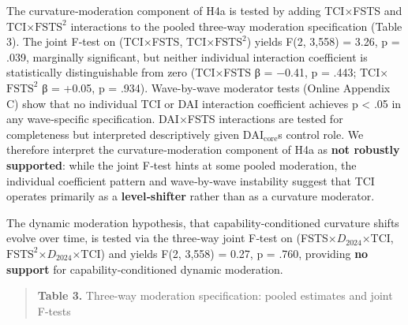 \documentclass[12pt,a4paper]{article}
\begin{document}
The curvature‑moderation component of H4a is tested by adding TCI×FSTS
and TCI×\(\mathrm{FSTS}^2\) interactions to the pooled three‑way
moderation specification (Table 3). The joint F‑test on (TCI×FSTS,
TCI×\(\mathrm{FSTS}^2\)) yields F(2, 3,558) = 3.26, p = .039, marginally
significant, but neither individual interaction coefficient is
statistically distinguishable from zero (TCI×FSTS β = −0.41, p = .443;
TCI×\(\mathrm{FSTS}^2\) β = +0.05, p = .934). Wave-by-wave moderator
tests (Online Appendix C) show that no individual TCI or DAI interaction
coefficient achieves p \textless{} .05 in any wave‑specific
specification. DAI×FSTS interactions are tested for completeness but
interpreted descriptively given
\(\mathrm{DAI}_{\text{core}}\)\textquotesingle s control role. We
therefore interpret the curvature‑moderation component of H4a as
\textbf{not robustly supported}: while the joint F‑test hints at some
pooled moderation, the individual coefficient pattern and wave‑by‑wave
instability suggest that TCI operates primarily as a
\textbf{level‑shifter} rather than as a curvature moderator.

The dynamic moderation hypothesis, that capability‑conditioned curvature
shifts evolve over time, is tested via the three‑way joint F‑test on
(FSTS×\(D_{2024}\)×TCI, \(\mathrm{FSTS}^2\)×\(D_{2024}\)×TCI) and yields
F(2, 3,558) = 0.27, p = .760, providing \textbf{no support} for
capability‑conditioned dynamic moderation.

\begin{quote}
\textbf{Table 3.} Three-way moderation specification: pooled estimates
and joint F-tests
\end{quote}
\end{document}
